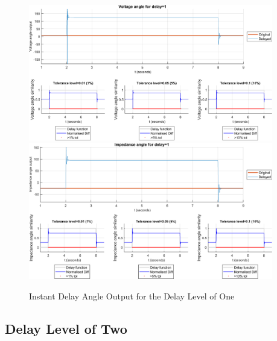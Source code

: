 \begin{figure}
    \caption{Instant Delay Angle Output for the Delay Level of One}
    \includegraphics[width=0.95\textwidth]{PMUsim-figures/DelayOf_1/Instant_vAngle.png}    
    \includegraphics[width=0.95\textwidth]{PMUsim-figures/DelayOf_1/Instant_iAngle.png}    
        \begin{small}
     \end{small}
    \label{fig:PMUsim_One_Angle}
\end{figure}
\newpage \subsection{Delay Level of Two}
